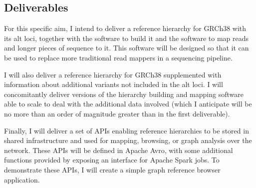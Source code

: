 \documentclass[11pt,proposal]{ucthesis}
\begin{document}
\subsection{Deliverables} 
\label{subsec:aim2deliverables}

For this specific aim, I intend to deliver a reference hierarchy for GRCh38 with its alt loci, together with the software to build it and the software to map reads and longer pieces of sequence to it. This software will be designed so that it can be used to replace more traditional read mappers in a sequencing pipeline.

I will also deliver a reference hierarchy for GRCh38 supplemented with information about additional variants not included in the alt loci. I will concomitantly deliver versions of the hierarchy building and mapping software able to scale to deal with the additional data involved (which I anticipate will be no more than an order of magnitude greater than in the first deliverable).

Finally, I will deliver a set of APIs enabling reference hierarchies to be stored in shared infrastructure and used for mapping, browsing, or graph analysis over the network. These APIs will be defined in Apache Avro, with some additional functions provided by exposing an interface for Apache Spark jobs. To demonstrate these APIs, I will create a simple graph reference browser application.


    
    
    
    
    

    
\end{document}
